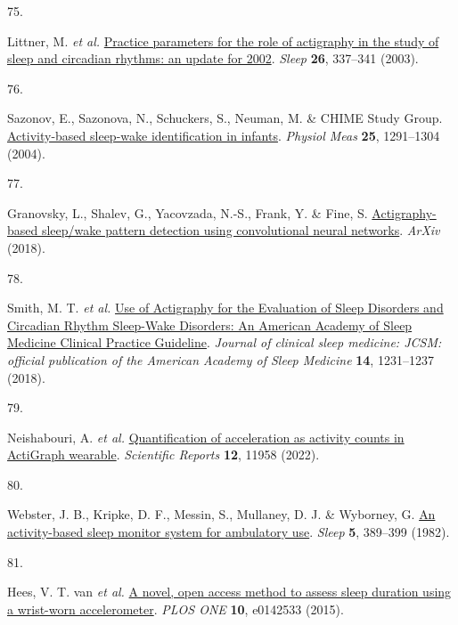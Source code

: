 \documentclass[
  10pt,
]{scrbook}
\newlength{\cslhangindent}
\newlength{\csllabelwidth}
\newlength{\cslentryspacingunit} %
\newenvironment{CSLReferences}[2] %
 {%
  \setlength{\parindent}{0pt}
  \ifodd #1
  \let\oldpar\par
  \def\par{\hangindent=\cslhangindent\oldpar}
  \fi
  \setlength{\parskip}{#2\cslentryspacingunit}
 }%
 {}
\newcommand{\CSLLeftMargin}[1]{\parbox[t]{\csllabelwidth}{#1}}
\newcommand{\CSLRightInline}[1]{\parbox[t]{\linewidth - \csllabelwidth}{#1}\break}
\let\originaltextbf\textbf
\renewcommand{\textbf}[1]{\textcolor{color1}{\textsf{\originaltextbf{#1}}}}
\begin{document}
\begin{CSLReferences}{0}{0}
\leavevmode{}%
\CSLLeftMargin{75. }%
\CSLRightInline{Littner, M. \emph{et al.}
\href{https://doi.org/10.1093/sleep/26.3.337}{Practice parameters for
the role of actigraphy in the study of sleep and circadian rhythms: an
update for 2002}. \emph{Sleep} \textbf{26}, 337--341 (2003).}

\leavevmode{}%
\CSLLeftMargin{76. }%
\CSLRightInline{Sazonov, E., Sazonova, N., Schuckers, S., Neuman, M. \&
CHIME Study Group.
\href{https://doi.org/10.1088/0967-3334/25/5/018}{Activity-based
sleep-wake identification in infants}. \emph{Physiol Meas} \textbf{25},
1291--1304 (2004).}

\leavevmode{}%
\CSLLeftMargin{77. }%
\CSLRightInline{Granovsky, L., Shalev, G., Yacovzada, N.-S., Frank, Y.
\& Fine, S.
\href{https://www.semanticscholar.org/paper/Actigraphy-based-Sleep-Wake-Pattern-Detection-using-Granovsky-Shalev/3b3043d8816e9caecb3ee2a52597da08c535bb95}{Actigraphy-based
sleep/wake pattern detection using convolutional neural networks}.
\emph{{ArXiv}} (2018).}

\leavevmode{}%
\CSLLeftMargin{78. }%
\CSLRightInline{Smith, M. T. \emph{et al.}
\href{https://doi.org/10.5664/jcsm.7230}{Use of Actigraphy for the
Evaluation of Sleep Disorders and Circadian Rhythm Sleep-Wake Disorders:
An American Academy of Sleep Medicine Clinical Practice Guideline}.
\emph{Journal of clinical sleep medicine: JCSM: official publication of
the American Academy of Sleep Medicine} \textbf{14}, 1231--1237 (2018).}

\leavevmode{}%
\CSLLeftMargin{79. }%
\CSLRightInline{Neishabouri, A. \emph{et al.}
\href{https://doi.org/10.1038/s41598-022-16003-x}{Quantification of
acceleration as activity counts in ActiGraph wearable}. \emph{Scientific
Reports} \textbf{12}, 11958 (2022).}

\leavevmode{}%
\CSLLeftMargin{80. }%
\CSLRightInline{Webster, J. B., Kripke, D. F., Messin, S., Mullaney, D.
J. \& Wyborney, G. \href{https://doi.org/10.1093/sleep/5.4.389}{An
activity-based sleep monitor system for ambulatory use}. \emph{Sleep}
\textbf{5}, 389--399 (1982).}

\leavevmode{}%
\CSLLeftMargin{81. }%
\CSLRightInline{Hees, V. T. van \emph{et al.}
\href{https://doi.org/10.1371/journal.pone.0142533}{A novel, open access
method to assess sleep duration using a wrist-worn accelerometer}.
\emph{{PLOS} {ONE}} \textbf{10}, e0142533 (2015).}


\end{CSLReferences}
\end{document}
